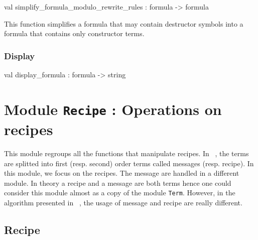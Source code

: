 \label{val:Term.simplify-underscoreformula-underscoremodulo-underscorerewrite-underscorerules}\begin{ocamldoccode}
val simplify_formula_modulo_rewrite_rules : formula -> formula
\end{ocamldoccode}
\begin{ocamldocdescription}
This function simplifies a formula that may contain destructor symbols into a formula that contains only constructor terms.


\end{ocamldocdescription}




\subsubsection{Display}




\label{val:Term.display-underscoreformula}\begin{ocamldoccode}
val display_formula : formula -> string
\end{ocamldoccode}


\section{Module {\tt{Recipe}} : Operations on recipes}
\label{module:Recipe}




\ocamldocvspace{0.5cm}



This module regroups all the functions that manipulate recipes. In ~\thesis , the terms
    are splitted into first (resp. second) order terms called messages (resp. recipe). 
    In this module, we focus on the recipes. The message are handled in a different module.
    In theory a recipe and a message are both terms hence one could consider this module almost 
    as a copy of the module {\tt{Term}}. However, in the algorithm presented in ~\thesis , the usage of
    message and recipe are really different.



\subsection{Recipe}




